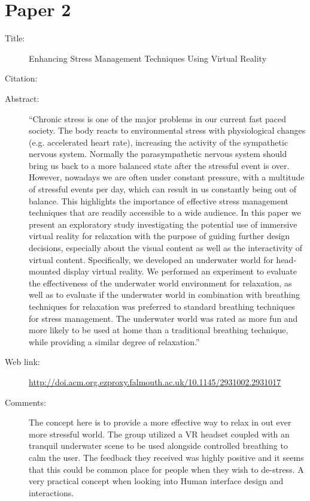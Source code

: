 \documentclass{scrartcl}
\begin{document}
	\section*{Paper 2}
	\begin{description}
		\item[Title:] Enhancing Stress Management Techniques Using Virtual Reality
		\item[Citation:] \cite{Soyka}
		\item[Abstract:] ``Chronic stress is one of the major problems in our current fast paced society. The body reacts to environmental stress with physiological changes (e.g. accelerated heart rate), increasing the activity of the sympathetic nervous system. Normally the parasympathetic nervous system should bring us back to a more balanced state after the stressful event is over. However, nowadays we are often under constant pressure, with a multitude of stressful events per day, which can result in us constantly being out of balance. This highlights the importance of effective stress management techniques that are readily accessible to a wide audience. In this paper we present an exploratory study investigating the potential use of immersive virtual reality for relaxation with the purpose of guiding further design decisions, especially about the visual content as well as the interactivity of virtual content. Specifically, we developed an underwater world for head-mounted display virtual reality. We performed an experiment to evaluate the effectiveness of the underwater world environment for relaxation, as well as to evaluate if the underwater world in combination with breathing techniques for relaxation was preferred to standard breathing techniques for stress management. The underwater world was rated as more fun and more likely to be used at home than a traditional breathing technique, while providing a similar degree of relaxation.''
		\item[Web link:] \url{http://doi.acm.org.ezproxy.falmouth.ac.uk/10.1145/2931002.2931017}
		\item[Comments:] The concept here is to provide a more effective way to relax in out ever more stressful world. The group utilized a VR headset coupled with an tranquil underwater scene to be used alongside controlled breathing to calm the user. The feedback they received was highly positive and it seems that this could be common place for people when they wish to de-stress. A very practical concept when looking into Human interface design and interactions.
	\end{description}
	
\end{document}
